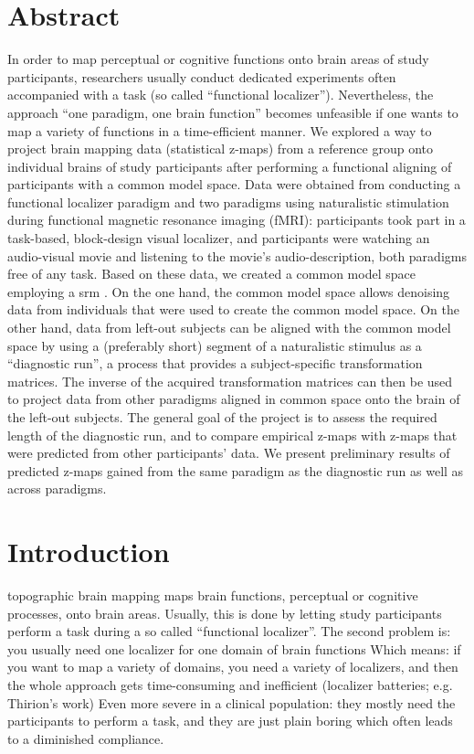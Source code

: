 \section{Abstract}
%
In order to map perceptual or cognitive functions onto brain areas of study
participants, researchers usually conduct dedicated experiments often
accompanied with a task (so called ``functional localizer'').
%
Nevertheless, the approach ``one paradigm, one brain function'' becomes
unfeasible if one wants to map a variety of functions in a time-efficient
manner.
%
We explored a way to project brain mapping data (statistical z-maps) from a
reference group onto individual brains of study participants after performing a
functional aligning of participants with a common model space.
%
Data were obtained from conducting a functional localizer paradigm and two
paradigms using naturalistic stimulation during functional magnetic resonance
imaging (fMRI):
%
participants took part in a task-based, block-design visual localizer, and
participants were watching an audio-visual movie and listening to the movie's
audio-description, both paradigms free of any task.
%
Based on these data, we created a common model space employing a \ac{srm}
\citep{chen2015reduced}.
%
On the one hand, the common model space allows denoising data from individuals
that were used to create the common model space.
%
On the other hand, data from left-out subjects can be aligned with the common
model space by using a (preferably short) segment of a naturalistic stimulus as
a ``diagnostic run'', a process that provides a subject-specific transformation
matrices.
%
The inverse of the acquired transformation matrices can then be used to project
data from other paradigms aligned in common space onto the brain of the left-out
subjects.
%
The general goal of the project is to assess the required length of the
diagnostic run, and to compare empirical z-maps with z-maps that were predicted
from other participants' data.
%
We present preliminary results of predicted z-maps gained from the same paradigm
as the diagnostic run as well as across paradigms.


\section{Introduction}
topographic brain mapping maps brain functions, perceptual or cognitive
processes, onto brain areas.
Usually, this is done by letting study participants perform a task during a so
called ``functional localizer''.
The second problem is: you usually need one localizer for one domain of brain
functions
Which means: if you want to map a variety of domains, you need a variety of
localizers, and then the whole approach gets time-consuming and inefficient
(localizer batteries; e.g. Thirion's work)
Even more severe in a clinical population: they mostly need the participants to
perform a task, and they are just plain boring which often leads to a diminished
compliance.


